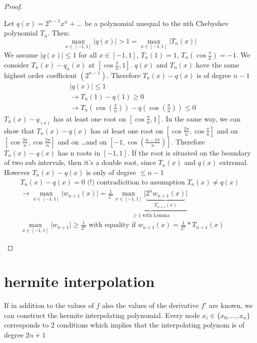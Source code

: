\begin{proof}
    \begin{lemma}
        Let $q(x)=2^{n-1}x^n+\ldots$  be a polynomial unequal to the nth Chebyshev polynomial $T_n$.
        Then:
        \begin{equation*}
            \max_{x \in [-1,1]} \lvert q(x) \rvert > 1= \max_{x \in [-1,1]} \lvert T_n(x) \rvert
        \end{equation*}
        We assume $\lvert q(x) \rvert \leq 1$ for all $x \in [-1,1]$, $T_n(1) = 1$, $T_n\left( \cos \frac{\pi}{n} \right) = -1$.
        We consider $T_n(x)-q_n(x)$ at $[\cos \frac{\pi}{n}, 1]$.
        $q(x)$ and $T_n(x)$ have the same highest order coefficient $(2^{n-1})$.
        Therefore $T_n(x)-q(x)$ is of degree $n-1$
        \begin{align*}
            &\lvert q(x) \rvert \leq 1\\
            &\to T_n(1)-q(1) \geq 0\\
            &\to T_n\left(\cos \left( \frac{\pi}{n} \right) \right) - q\left(\cos \left( \frac{\pi}{n} \right) \right) \leq 0
        \end{align*}
        $T_n(x)-q_(x)$ has at least one root on $[\cos\frac{\pi}{n}, 1]$.
        In the same way, we can show that $T_n(x)-q(x)$ has at least one root on $[\cos\frac{2\pi}{n},\cos\frac{\pi}{n}]$
        and on $[\cos\frac{3\pi}{n},\cos\frac{2\pi}{n}]$ and on \ldots and on $[-1, \cos \left( \frac{n-1  \pi}{n} \right)]$.
        Therefore $T_n(x)-q(x)$ has n roots in $[-1,1]$.
        If the root is situated on the boundary of two sub intervals, then it's a double root, since $T_n(x)$ and $q(x)$ extremal.
        However $T_n(x) - q(x)$ is only of degree $\leq n-1$
        \begin{align*}
            T_n(x)-q(x) = 0 \text{ (!) contradicition to assumption } T_n(x) \neq q(x) \\
            \to \max_{x \in [-1,1]} \lvert w_{n+1}(x) \rvert = \frac{1}{2^n}
            \underbrace{\max_{x \in [-1,1]} \lvert \underbrace{2^n w_{n+1}(x)}_{T_{n+1}(x)} \rvert}_{ \geq 1 \text{ with Lemma}}\\
            \max_{x \in [-1,1]} \lvert w_{n+1}  \rvert \geq \frac{1}{2^n} \text{ with equality if } w_{n+1}(x) = \frac{1}{2^n}*T_{n+1}(x)
        \end{align*}
    \end{lemma}
\end{proof}


\section{hermite interpolation}\label{sec:hermite-interpolation}
If in addition to the values of $f$ also the values of the derivative $f'$ are known, we can construct the hermite interpolating polynomial.
Every node $x_i \in \{ x_0, \ldots, x_n \}$ corresponds to $2$ conditions which implies that the interpolating polynom is of degree $2n+1$

